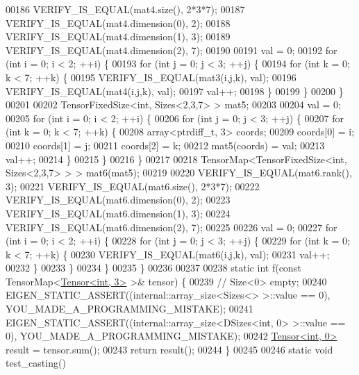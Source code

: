 \begin{DoxyCode}
00186   VERIFY\_IS\_EQUAL(mat4.size(), 2*3*7);
00187   VERIFY\_IS\_EQUAL(mat4.dimension(0), 2);
00188   VERIFY\_IS\_EQUAL(mat4.dimension(1), 3);
00189   VERIFY\_IS\_EQUAL(mat4.dimension(2), 7);
00190 
00191   val = 0;
00192   \textcolor{keywordflow}{for} (\textcolor{keywordtype}{int} i = 0; i < 2; ++i) \{
00193     \textcolor{keywordflow}{for} (\textcolor{keywordtype}{int} j = 0; j < 3; ++j) \{
00194       \textcolor{keywordflow}{for} (\textcolor{keywordtype}{int} k = 0; k < 7; ++k) \{
00195         VERIFY\_IS\_EQUAL(mat3(i,j,k), val);
00196         VERIFY\_IS\_EQUAL(mat4(i,j,k), val);
00197         val++;
00198       \}
00199     \}
00200   \}
00201 
00202   TensorFixedSize<int, Sizes<2,3,7> > mat5;
00203 
00204   val = 0;
00205   \textcolor{keywordflow}{for} (\textcolor{keywordtype}{int} i = 0; i < 2; ++i) \{
00206     \textcolor{keywordflow}{for} (\textcolor{keywordtype}{int} j = 0; j < 3; ++j) \{
00207       \textcolor{keywordflow}{for} (\textcolor{keywordtype}{int} k = 0; k < 7; ++k) \{
00208         array<ptrdiff\_t, 3> coords;
00209         coords[0] = i;
00210         coords[1] = j;
00211         coords[2] = k;
00212         mat5(coords) = val;
00213         val++;
00214       \}
00215     \}
00216   \}
00217 
00218   TensorMap<TensorFixedSize<int, Sizes<2,3,7> > > mat6(mat5);
00219 
00220   VERIFY\_IS\_EQUAL(mat6.rank(), 3);
00221   VERIFY\_IS\_EQUAL(mat6.size(), 2*3*7);
00222   VERIFY\_IS\_EQUAL(mat6.dimension(0), 2);
00223   VERIFY\_IS\_EQUAL(mat6.dimension(1), 3);
00224   VERIFY\_IS\_EQUAL(mat6.dimension(2), 7);
00225 
00226   val = 0;
00227   \textcolor{keywordflow}{for} (\textcolor{keywordtype}{int} i = 0; i < 2; ++i) \{
00228     \textcolor{keywordflow}{for} (\textcolor{keywordtype}{int} j = 0; j < 3; ++j) \{
00229       \textcolor{keywordflow}{for} (\textcolor{keywordtype}{int} k = 0; k < 7; ++k) \{
00230         VERIFY\_IS\_EQUAL(mat6(i,j,k), val);
00231         val++;
00232       \}
00233     \}
00234   \}
00235 \}
00236 
00237 
00238 \textcolor{keyword}{static} \textcolor{keywordtype}{int} f(\textcolor{keyword}{const} TensorMap<\hyperlink{class_eigen_1_1_tensor}{Tensor<int, 3>} >& tensor) \{
00239   \textcolor{comment}{//  Size<0> empty;}
00240   EIGEN\_STATIC\_ASSERT((internal::array\_size<Sizes<> >::value == 0), YOU\_MADE\_A\_PROGRAMMING\_MISTAKE);
00241   EIGEN\_STATIC\_ASSERT((internal::array\_size<DSizes<int, 0> >::value == 0), YOU\_MADE\_A\_PROGRAMMING\_MISTAKE);
00242   \hyperlink{class_eigen_1_1_tensor}{Tensor<int, 0>} result = tensor.sum();
00243   \textcolor{keywordflow}{return} result();
00244 \}
00245 
00246 \textcolor{keyword}{static} \textcolor{keywordtype}{void} test\_casting()

\end{DoxyCode}
